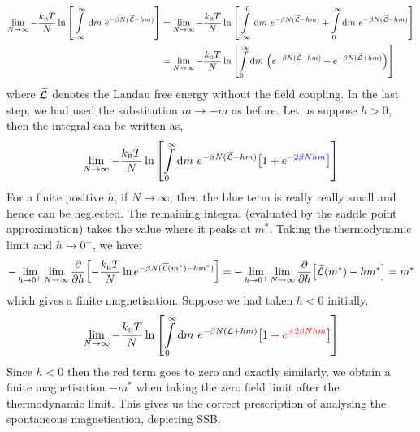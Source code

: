 \begin{align}
    \begin{split}
        \lim\limits_{N\to \infty} -\frac{k_{\text{\tiny B}} T}{N}\ln\qty[ \int\limits_{-\infty}^{\infty} \dd m \ e^{-\beta N (\widetilde{\mathcal L} - hm)}] &=  \lim\limits_{N\to \infty} -\frac{k_{\text{\tiny B}} T}{N}\ln\qty[ \int\limits_{-\infty}^{0} \dd m \ e^{-\beta N (\widetilde{\mathcal L} - hm)}+\int\limits_{0}^{\infty} \dd m \ e^{-\beta N (\widetilde{\mathcal L} - hm)}]\\
        &= \lim\limits_{N\to \infty} -\frac{k_{\text{\tiny B}} T}{N}\ln\qty[ \int\limits_{0}^{\infty} \dd m \ \qty(e^{-\beta N (\widetilde{\mathcal L} - hm)}    + e^{-\beta N (\widetilde{\mathcal L} + hm)})]
    \end{split}
\end{align}
where $\widetilde{\mathcal L}$ denotes the Landau free energy without the field coupling. In the last step, we had used the substitution $m\to -m$ as before. Let us suppose $h> 0$, then the integral can be written as,
\begin{align}
    \lim\limits_{N\to \infty} -\frac{\kb T}{N}\ln\qty[ \int\limits_{0}^{\infty} \dd m \ e^{-\beta N (\widetilde{\SL} - hm)}\qty[  1  + \mathcolor{blue}{e^{-2\beta N hm}}]]
\end{align}
For a finite positive $h$, if $N\to \infty$, then the blue term is really really small and hence can be neglected. The remaining integral (evaluated by the saddle point approximation) takes the value where it peaks at $m^*$. Taking the thermodynamic limit and $h\to 0^+$, we have: 
\begin{equation}
   - \lim\limits_{h\to 0^+} \lim\limits_{N\to \infty} \pdv{h}\qty[-\frac{k_{\text{\tiny B}} T}{N} \ln e^{-\beta N (\widetilde{\mathcal L}(m^*) - h m^*)}] = -\lim\limits_{h\to 0^+} \lim\limits_{N\to \infty} \pdv{h}\qty[ \widetilde{\mathcal L}(m^*) - h m^*] =  m^*
\end{equation}
which gives a finite magnetisation. Suppose we had taken $h<0$ initially,
\begin{align}
    \lim\limits_{N\to \infty} -\frac{\kb T}{N}\ln\qty[ \int\limits_{0}^{\infty} \dd m \ e^{-\beta N (\widetilde{\SL} + hm)}\qty[  1  + \mathcolor{red}{e^{+2\beta N hm}}]]
\end{align}
Since $h<0$ then the red term goes to zero and exactly similarly, we obtain a finite magnetisation $-m^*$ when taking the zero field limit after the thermodynamic limit. This gives us the correct prescription of analysing the spontaneous magnetisation, depicting SSB. 